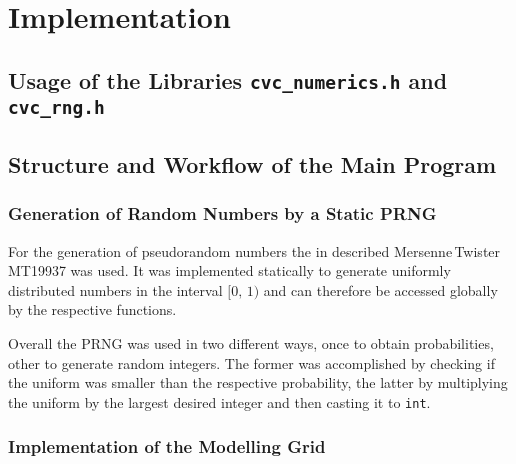 \section{Implementation}

\subsection{Usage of the Libraries \texttt{cvc\_numerics.h} and \texttt{cvc\_rng.h}}

\subsection{Structure and Workflow of the Main Program}

\subsubsection{Generation of Random Numbers by a Static PRNG}

For the generation of pseudorandom numbers the in  described Mersenne\,Twister MT19937 was used. It was implemented statically to generate uniformly distributed
numbers in the interval $[0,\,1)$ and can therefore be accessed globally by the respective functions. 

Overall the PRNG was used in two different ways, once to obtain probabilities, other to generate random integers.
The former was accomplished by checking if the uniform was smaller than the respective probability, the latter by multiplying the uniform by the largest desired integer and then casting it to \texttt{int}.


\subsubsection{Implementation of the Modelling Grid}

